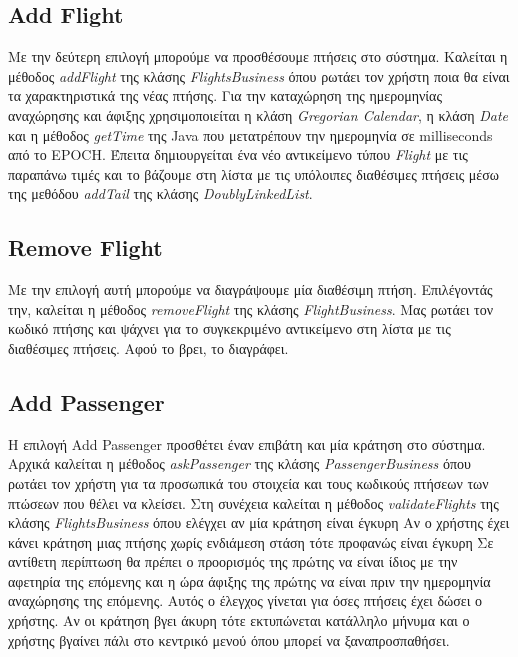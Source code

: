 \documentclass[a4paper]{article}
\begin{document}
\subsection{Add Flight}
Με την δεύτερη επιλογή μπορούμε να προσθέσουμε πτήσεις στο σύστημα. Καλείται η
μέθοδος \emph{addFlight} της κλάσης \emph{FlightsBusiness} όπου ρωτάει τον
χρήστη ποια θα είναι τα χαρακτηριστικά της νέας πτήσης. Για την καταχώρηση της
ημερομηνίας αναχώρησης και άφιξης χρησιμοποιείται η κλάση \emph{Gregorian
Calendar}, η κλάση \emph{Date} και η μέθοδος \emph{getTime }της Java που 
μετατρέπουν την ημερομηνία σε milliseconds από το EPOCH. Έπειτα δημιουργείται
ένα νέο αντικείμενο τύπου \emph{Flight} με τις παραπάνω τιμές και το βάζουμε στη
λίστα με τις υπόλοιπες διαθέσιμες πτήσεις μέσω της μεθόδου \emph{addTail} της
κλάσης \emph{DoublyLinkedList}.

\subsection{Remove Flight}
Με την επιλογή αυτή μπορούμε να διαγράψουμε μία διαθέσιμη πτήση. Επιλέγοντάς
την, καλείται η μέθοδος \emph{removeFlight} της κλάσης \emph{FlightBusiness}.
Μας ρωτάει τον κωδικό πτήσης και ψάχνει για το συγκεκριμένο αντικείμενο στη
λίστα με τις διαθέσιμες πτήσεις. Αφού το βρει, το διαγράφει.

\subsection{Add Passenger}
Η επιλογή Add Passenger προσθέτει έναν επιβάτη και μία κράτηση στο σύστημα.
Αρχικά καλείται η μέθοδος \emph{askPassenger} της κλάσης
\emph{PassengerBusiness} όπου ρωτάει τον χρήστη για τα προσωπικά του στοιχεία
και τους κωδικούς πτήσεων των πτώσεων που θέλει να κλείσει. Στη συνέχεια καλείται
η μέθοδος \emph{validateFlights} της κλάσης \emph{FlightsBusiness} όπου
ελέγχει αν μία κράτηση είναι έγκυρη Αν ο χρήστης έχει κάνει κράτηση μιας πτήσης
χωρίς ενδιάμεση στάση τότε προφανώς είναι έγκυρη Σε αντίθετη περίπτωση θα
πρέπει ο προορισμός της πρώτης να είναι ίδιος με την αφετηρία της επόμενης και η
ώρα άφιξης της πρώτης να είναι πριν την ημερομηνία αναχώρησης της επόμενης.
Αυτός ο έλεγχος γίνεται για όσες πτήσεις έχει δώσει ο χρήστης. Αν οι κράτηση
βγει άκυρη τότε εκτυπώνεται κατάλληλο μήνυμα και ο χρήστης βγαίνει πάλι στο
κεντρικό μενού όπου μπορεί να ξαναπροσπαθήσει.
\end{document}
